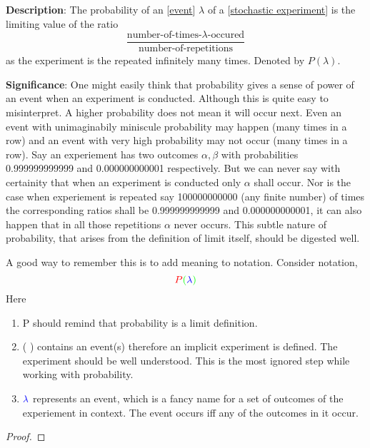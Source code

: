 \documentclass[../main.tex]{subfiles}
\begin{document}
\begin{statement}
\label{statement:Probability}\hspace*{0pt}\par
\end{statement}
\textbf{Description}:
The probability of an [\hyperref[statement:Event]{event}] $ \lambda $ of a [\hyperref[statement:Stochastic Experiment]{stochastic experiment}] is the limiting value of the ratio
\[
\frac{\text{number-of-times-$\lambda$-occured}}{\text{number-of-repetitions}}
\]
as the experiment is the repeated infinitely many times. Denoted by $ P(\lambda) $.
\par
{\color{magenta} \textbf{Significance}:
One might easily think that probability gives a sense of power of an event when an experiment is conducted.
Although this is quite easy to misinterpret.
A higher probability does not mean it will occur next.
Even an event with unimaginabily miniscule probability may happen (many times in a row) and an event with very high probability may not occur (many times in a row).
Say an experiement has two outcomes $ \alpha, \beta $ with probabilities 0.999999999999 and 0.000000000001 respectively.
But we can never say with certainity that when an experiment is conducted only $ \alpha $ shall occur.
Nor is the case when experiement is repeated say 100000000000 (any finite number) of times the corresponding ratios shall be 0.999999999999 and 0.000000000001, it can also happen that in all those repetitions $ \alpha $ never occurs.
This subtle nature of probability, that arises from the definition of limit itself, should be digested well.

A good way to remember this is to add meaning to notation.
Consider notation,
\[
    {\color{red} P} {\color{green}  (} {\color{blue} \lambda} {\color{green} )}
\]
Here
\begin{enumerate}[nolistsep]
    \item {\color{red} P} should remind that probability is a limit definition.
    \item {\color{green}  (} {\color{green} )} contains an event(s) therefore an implicit experiment is defined.
    The experiment should be well understood.
    This is the most ignored step while working with probability.
    \item ${\color{blue} \lambda}$ represents an event, which is a fancy name for a set of outcomes of the experiement in context. The event occurs iff any of the outcomes in it occur.
\end{enumerate}
\par}
\begin{proof}
\proofbydefinition
\end{proof}\par
\end{document}
